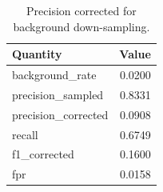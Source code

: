 \begin{table}[t]
\centering
\caption{Precision corrected for background down-sampling.}
\label{tab:network-sampling}
\begin{tabular}{lr}
\toprule
Quantity & Value \\
\midrule
background\_rate & 0.0200 \\
precision\_sampled & 0.8331 \\
precision\_corrected & 0.0908 \\
recall & 0.6749 \\
f1\_corrected & 0.1600 \\
fpr & 0.0158 \\
\bottomrule
\end{tabular}
\end{table}
